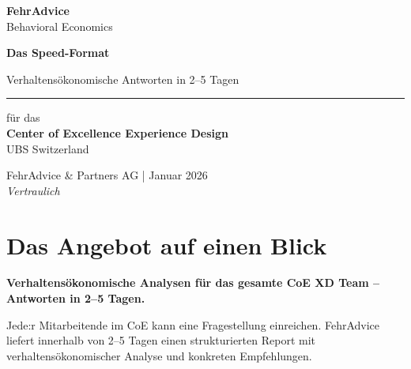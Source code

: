 \documentclass[11pt,a4paper]{article}
\begin{document}
\begin{titlepage}
\begin{center}
\vspace*{1.5cm}

{\Huge\color{fadarkblue}\textbf{FehrAdvice}}\\[0.2cm]
{\large\color{falightblue}Behavioral Economics}

\vspace{1.5cm}

{\Huge\bfseries\color{fadarkblue}Das Speed-Format\par}
\vspace{0.5cm}
{\Large\color{falightblue}Verhaltensökonomische Antworten in 2--5 Tagen\par}

\vspace{0.8cm}
{\color{fadarkblue}\rule{0.8\textwidth}{2pt}}
\vspace{0.8cm}

{\large für das\\[0.3cm]\textbf{Center of Excellence Experience Design}\\[0.3cm]UBS Switzerland\par}

\vfill

{\small\color{fadarkgray}
FehrAdvice \& Partners AG | Januar 2026\\[0.3cm]
\textit{Vertraulich}
}

\end{center}
\end{titlepage}

\section{Das Angebot auf einen Blick}

\begin{fainfobox}
\textbf{Verhaltensökonomische Analysen für das gesamte CoE XD Team -- Antworten in 2--5 Tagen.}

\vspace{0.3cm}
Jede:r Mitarbeitende im CoE kann eine Fragestellung einreichen. FehrAdvice liefert innerhalb von 2--5 Tagen einen strukturierten Report mit verhaltensökonomischer Analyse und konkreten Empfehlungen.
\end{fainfobox}
\end{document}
